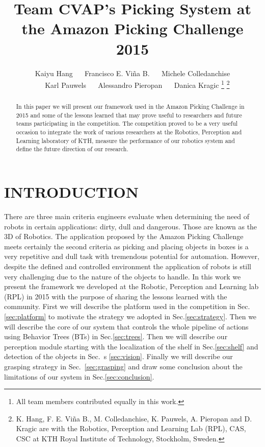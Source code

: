 \documentclass[letterpaper, 10pt, conference]{ieeeconf}
\title{\LARGE \bf Team CVAP's Picking System at the Amazon Picking Challenge 2015}
\author{Kaiyu Hang ~~ Francisco E. Vi\~na B. ~~ Michele Colledanchise \\ ~~ Karl Pauwels ~~ Alessandro Pieropan ~~ Danica Kragic%
\thanks{All team members contributed equally in this work.}%
\thanks{K. Hang, F. E. Vi\~na B., M. Colledanchise, K. Pauwels, A. Pieropan and D. Kragic are with the
Robotics, Perception and Learning Lab (RPL), CAS, CSC at KTH Royal Institute of
Technology, Stockholm, Sweden.}%
}
\begin{document}
                                                                
                                                                                
\maketitle                                                                      
\thispagestyle{empty}                                                           
\pagestyle{empty}



\begin{abstract}

In this paper we will present our framework used in the Amazon Picking Challenge in 2015 and some of the  lessons learned that may prove useful to researchers and future teams participating in the competition. The competition proved to be a very useful occasion to integrate the work of various researchers at the Robotics, Perception and Learning laboratory of KTH, measure the performance of our robotics system and define the future direction of our research.

\end{abstract}

\section{INTRODUCTION}
\label{sec:introduction}

There are three main criteria engineers evaluate when determining the need of robots in certain applications: dirty, dull and dangerous. Those are known as the 3D of Robotics. The application proposed by the Amazon Picking Challenge meets certainly the second criteria as picking and placing objects in boxes is a very repetitive and dull task with tremendous potential
for automation. However, despite the defined and controlled environment the application of robots is still very challenging due to the nature of the objects to handle.
In this work we present the framework we developed at the Robotic, Perception and Learning lab (RPL) in 2015 with the purpose of sharing the lessons learned with the community.
First we will describe the platform used in the competition in Sec.\ref{sec:platform} to motivate the strategy we adopted in Sec.\ref{sec:strategy}. Then we will describe the core of our system that controls the whole pipeline of actions using Behavior Trees (BTs) in Sec.\ref{sec:trees}. Then we will describe our perception module starting with the localization of the shelf in Sec.\ref{sec:shelf} and detection of the objects in Sec.~s \ref{sec:vision}. Finally we will describe our grasping strategy in Sec.~\ref{sec:grasping} and draw some conclusion about the limitations of our system in Sec.\ref{sec:conclusion}.
\end{document}
